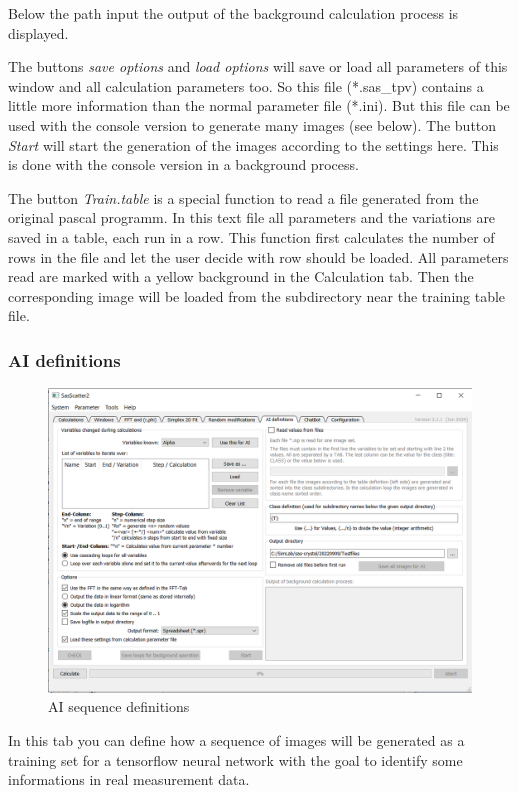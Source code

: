 \documentclass[11pt]{article} %
\begin{document}
Below the path input the output of the background calculation process is displayed.

The buttons {\it save options} and {\it load options} will save or load all parameters of this window and all calculation parameters too. So this file (*.sas\_tpv) contains a little more information than the normal parameter file (*.ini). But this file can be used with the console version to generate many images (see below).
The button {\it Start} will start the generation of the images according to the settings here. This is done with the console version in a background process.

The button {\it Train.table} is a special function to read a file generated from the original pascal programm. In this text file all parameters and the variations are saved in a table, each run in a row. This function first calculates the number of rows in the file and let the user decide with row should be loaded. All parameters read are marked with a yellow background in the Calculation tab. Then the corresponding image will be loaded from the  subdirectory near the training table file.



\subsubsection{AI definitions}
\begin{figure}[H]
 \centering
 \includegraphics[width=\textwidth]{gui-aidef.png}
 \caption{AI sequence definitions}
\end{figure}

In this tab you can define how a sequence of images will be generated as a training set for a tensorflow neural network with the goal to identify some informations in real measurement data.
\end{document}
